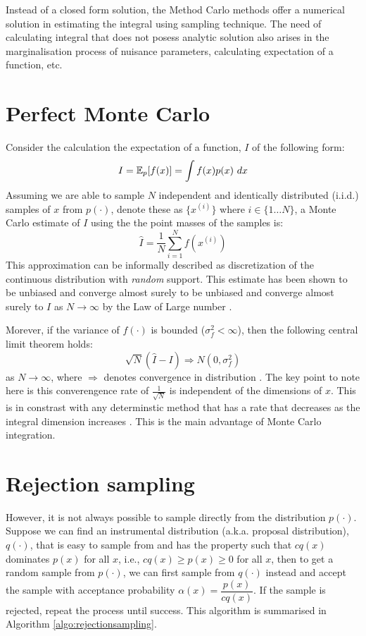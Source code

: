 Instead of a closed form solution, the Method Carlo methods offer a numerical solution in estimating the integral using sampling technique. The need of calculating integral that does not posess analytic solution also arises in the marginalisation process of nuisance parameters, calculating expectation of a function, etc.

\section{Perfect Monte Carlo}
Consider the calculation the expectation of a function, $I$ of the following form:
\begin{equation}
  I = \operatorname{\mathbb{E}}_p[f(x)] = \int f(x)p(x)~dx
\label{eq:expectation}
\end{equation}
Assuming we are able to sample $N$ independent and identically distributed (i.i.d.) samples of $x$ from $p(\cdot)$, denote these as $\{x^{(i)}\}$ where $i \in \{1 \ldots N\}$, a Monte Carlo estimate of $I$ using the the point masses of the samples is:
\begin{equation}
  \hat{I} = \frac{1}{N} \sum^N_{i=1} f(x^{(i)})
\end{equation}
This approximation can be informally described as discretization of the continuous distribution with \emph{random} support. This estimate has been shown to be unbiased and converge almost surely to be unbiased and converge almost surely to $I$ as $N \rightarrow \infty$ by the Law of Large number \cite{RCP05}. 

Morever, if the variance of $f(\cdot)$ is bounded ($\sigma^2_f < \infty$), then the following central limit theorem holds:
\begin{equation}
  \sqrt{N}(\hat{I} - I) \Longrightarrow N(0, \sigma^2_f)
\end{equation}
as $N \rightarrow \infty$, where $\Longrightarrow$ denotes convergence in distribution \cite{AD09}. The key point to note here is this converengence rate of $\frac{1}{\sqrt{N}}$ is independent of the dimensions of $x$. This is in constrast with any determinstic method that has a rate that decreases as the integral dimension increases \cite{RCP05}. This is the main advantage of Monte Carlo integration.

\section{Rejection sampling}
However, it is not always possible to sample directly from the distribution $p(\cdot)$. Suppose we can find an instrumental distribution (a.k.a. proposal distribution), $q(\cdot)$, that is easy to sample from and has the property such that $cq(x)$ dominates $p(x)$ for all $x$, i.e., $cq(x) \geq p(x) \geq 0$ for all $x$, then to get a random sample from $p(\cdot)$, we can first sample from $q(\cdot)$ instead and accept the sample with acceptance probability $\alpha(x)=\dfrac{p(x)}{cq(x)}$. If the sample is rejected, repeat the process until success. This algorithm is summarised in Algorithm \ref{algo:rejectionsampling}.

